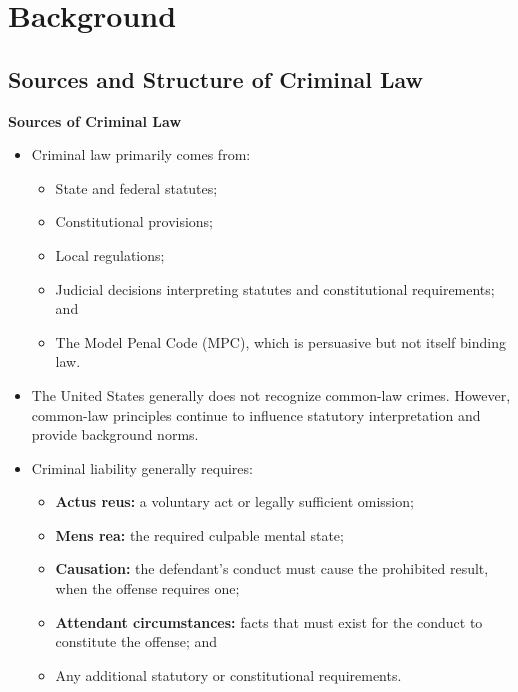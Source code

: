 \documentclass[11pt]{tex/lawoutline}
\begin{document}
\maketitle
\tableofcontents

\chapter{Background}

\section{Sources and Structure of Criminal Law}

\textbf{Sources of Criminal Law}
\begin{itemize}
    \item Criminal law primarily comes from:
    \begin{itemize}
        \item State and federal statutes;
        \item Constitutional provisions;
        \item Local regulations;
        \item Judicial decisions interpreting statutes and constitutional requirements; and
        \item The Model Penal Code (MPC), which is persuasive but not itself binding law.
    \end{itemize}

    \item The United States generally does not recognize common-law crimes. However, common-law principles continue to influence statutory interpretation and provide background norms.

    \item Criminal liability generally requires:
    \begin{itemize}
        \item \textbf{Actus reus:} a voluntary act or legally sufficient omission;
        \item \textbf{Mens rea:} the required culpable mental state;
        \item \textbf{Causation:} the defendant's conduct must cause the prohibited result, when the offense requires one;
        \item \textbf{Attendant circumstances:} facts that must exist for the conduct to constitute the offense; and
        \item Any additional statutory or constitutional requirements.
    \end{itemize}
\end{itemize}
\end{document}
